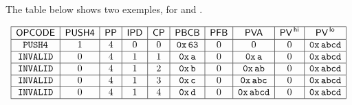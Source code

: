 The table below shows two exemples, for  and .

\[
\begin{array}{|c|c|c|c|c|c|c|c|c|c|}
\hline
\textsf{OPCODE}           & \textsf{PUSH4}{} & \textsf{PP}{} & \textsf{IPD}{} & \textsf{CP}{} & \textsf{PBCB}{}         & \textsf{PFB}{} & \textsf{PVA}                 & \textsf{PV}^{\mathsf{\,hi}}{} & \textsf{PV}^{\mathsf{\,lo}}{}         \\\hline
\texttt{PUSH4}   & 1     & 4     & 0      & 0     & \mathtt{0x\,63} & 0      & 0                    & 0          & \mathtt{0x\,abcd} \\\hline
\texttt{INVALID} & 0     & 4     & 1      & 1     & \mathtt{0x\,a}  & 0      & \mathtt{0x\,a}       & 0          & \mathtt{0x\,abcd} \\\hline
\texttt{INVALID} & 0     & 4     & 1      & 2     & \mathtt{0x\,b}  & 0      & \mathtt{0x\,ab}      & 0          & \mathtt{0x\,abcd} \\\hline
\texttt{INVALID} & 0     & 4     & 1      & 3     & \mathtt{0x\,c}  & 0      & \mathtt{0x\,abc}     & 0          & \mathtt{0x\,abcd} \\\hline
\texttt{INVALID} & 0     & 4     & 1      & 4     & \mathtt{0x\,d}  & 0      & \mathtt{0x\,abcd}    & 0          & \mathtt{0x\,abcd} \\\hline
\end{array}
\]


